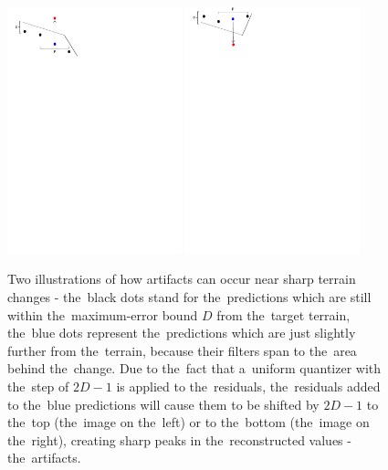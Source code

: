 \begin{figure}
	\includegraphics[trim={0 24cm 7cm 0}, clip, width=0.45\textwidth]{figures/artifs_theory.pdf}\centering
	\includegraphics[trim={0 24cm 7cm 0}, clip, width=0.45\textwidth]{figures/artifs_theory2.pdf}\centering
	\caption{Two illustrations of how artifacts can occur near sharp terrain changes - the~black dots stand for the~predictions which are still within the~maximum-error bound $D$ from the~target terrain, the~blue dots represent the~predictions which are just slightly further from the~terrain, because their filters span to the~area behind the~change. Due to the~fact that a~uniform quantizer with the~step of $2D-1$ is applied to the~residuals, the~residuals added to the~blue predictions will cause them to be shifted by $2D - 1$ to the~top (the~image on the~left) or to the~bottom (the~image on the~right), creating sharp peaks in the~reconstructed values - the~artifacts.}
	\label{fig:artifs_theory}
\end{figure}

